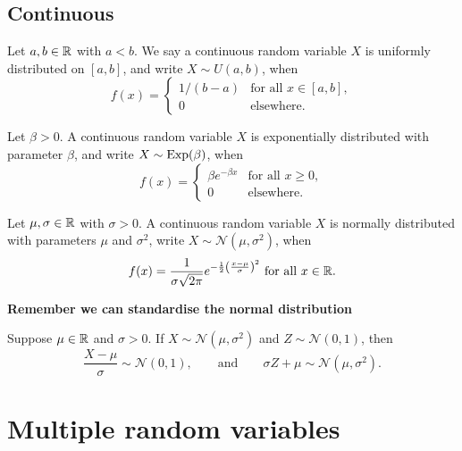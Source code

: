 \documentclass[10pt, a4paper]{article}
\begin{document}
\subsection{Continuous}

\begin{definition}
    Let $a, b \in \mathbb{R}$ with $a < b$.
    We say a continuous random variable $X$ is uniformly distributed on $[a, b]$,
    and write $X \sim U(a, b)$,
    when
    \[
    f(x) = \begin{cases}
        1 / (b - a) &\text{for all } x \in [a, b], \\
        0 &\text{elsewhere}.
    \end{cases}
    \]
\end{definition}

\begin{definition}
    Let $\beta > 0$.
    A continuous random variable $X$ is exponentially distributed with parameter $\beta$,
    and write $X \sim \operatorname{Exp}(\beta)$,
    when
    \[
    f(x) = \begin{cases}
        \beta e ^ {-\beta x} &\text{for all } x \geq 0, \\
        0 &\text{elsewhere}.
    \end{cases}
    \]
\end{definition}

\begin{definition}
    Let $\mu, \sigma \in \mathbb{R}$ with $\sigma > 0$.
    A continuous random variable $X$ is normally distributed with parameters $\mu$ and $\sigma ^ 2$,
    write $X \sim \mathcal{N}(\mu, \sigma ^ 2)$,
    when
    \[
    f(x) = \frac{1}{\sigma\sqrt{2\pi}}e ^ {-\frac{1}{2}\left(\frac{x - \mu}{\sigma}\right) ^ 2}\text{ for all } x \in \mathbb{R}.
    \]
\end{definition}

\textbf{Remember we can standardise the normal distribution}
\begin{theorem}
    Suppose $\mu \in \mathbb{R}$ and $\sigma > 0$.
    If $X \sim \mathcal{N}(\mu, \sigma ^ 2)$ and $Z \sim \mathcal{N}(0, 1)$,
    then
    \[
    \frac{X - \mu}{\sigma} \sim \mathcal{N}(0, 1),\qquad\text{and}\qquad\sigma Z + \mu \sim \mathcal{N}(\mu, \sigma ^ 2).
    \]
\end{theorem}

\newpage

\section{Multiple random variables}
\end{document}
